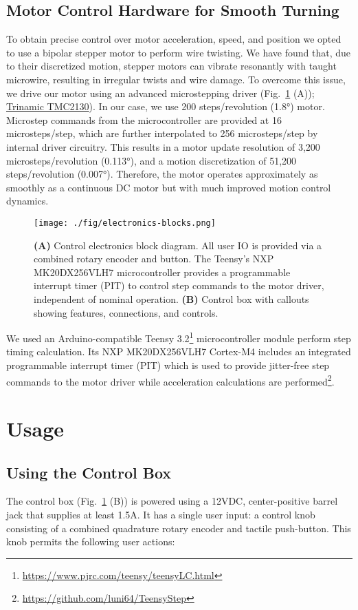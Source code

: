 \documentclass[11pt,a4paper]{article}
\begin{document}
\subsection{Motor Control Hardware for Smooth Turning}
To obtain precise control over motor acceleration, speed, and position we opted
to use a bipolar stepper motor to perform wire twisting. We have found that,
due to their discretized motion, stepper motors can vibrate resonantly with
taught microwire, resulting in irregular twists and wire damage. To overcome
this issue, we drive our motor using an advanced microstepping driver
(Fig.~\ref{f:ctrl-box} (A));
\href{https://www.trinamic.com/products/integrated-circuits/details/tmc2100/}{Trinamic
TMC2130}). In our case, we use 200 steps/revolution (\ang{1.8})
motor. Microstep commands from the microcontroller are provided at 16
microsteps/step, which are further interpolated to 256 microsteps/step by
internal driver circuitry. This results in a motor update resolution of 3,200
microsteps/revolution (\ang{0.113}), and a motion discretization of 51,200
steps/revolution (\ang{0.007}). Therefore, the motor operates approximately as
smoothly as a continuous DC motor but with much improved motion control
dynamics.

\begin{figure}
\centering
\texttt{[image: ./fig/electronics-blocks.png]}
\caption{\textbf{(A)} Control electronics block diagram. All user IO is
    provided via a combined rotary encoder and button. The Teensy's NXP
    MK20DX256VLH7 microcontroller provides a  programmable interrupt timer
    (PIT) to control step commands to the motor driver, independent of nominal
    operation.
    \textbf{(B)} Control box with callouts showing features, connections, and
    controls.}
\label{f:ctrl-box}
\end{figure}

We used an Arduino-compatible Teensy
3.2\footnote{\url{https://www.pjrc.com/teensy/teensyLC.html}} microcontroller
module perform step timing calculation. Its NXP MK20DX256VLH7 Cortex-M4
includes an integrated programmable interrupt timer (PIT) which is used to
provide jitter-free step commands to the motor driver while acceleration
calculations are
performed\footnote{\url{https://github.com/luni64/TeensyStep}}.

\section{Usage}

\subsection{Using the Control Box}
The control box (Fig.~\ref{f:ctrl-box} (B)) is powered using a 12VDC,
center-positive barrel jack that supplies at least 1.5A. It has a single user
input: a control knob consisting of a combined quadrature rotary encoder and
tactile push-button. This knob permits the following user actions:
\end{document}
